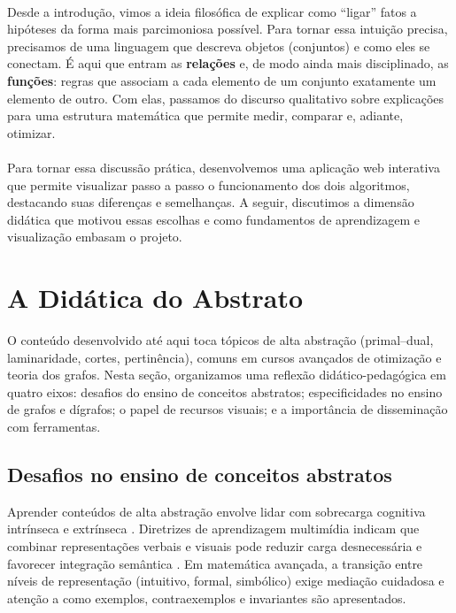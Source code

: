 \documentclass[12pt,a4paper]{article}
\begin{document}
\paragraph{}
Desde a introdução, vimos a ideia filosófica de explicar como “ligar” fatos a hipóteses da forma mais parcimoniosa possível. Para tornar essa intuição precisa, precisamos de uma linguagem que descreva objetos (conjuntos) e como eles se conectam. É aqui que entram as \textbf{relações} e, de modo ainda mais disciplinado, as \textbf{funções}: regras que associam a cada elemento de um conjunto exatamente um elemento de outro. Com elas, passamos do discurso qualitativo sobre explicações para uma estrutura matemática que permite medir, comparar e, adiante, otimizar.

\paragraph{}
Para tornar essa discussão prática, desenvolvemos uma aplicação web interativa que permite visualizar passo a passo o funcionamento dos dois algoritmos, destacando suas diferenças e semelhanças. A seguir, discutimos a dimensão didática que motivou essas escolhas e como fundamentos de aprendizagem e visualização embasam o projeto.

\section{A Didática do Abstrato}
\label{sec:didatica-abstrato}

O conteúdo desenvolvido até aqui toca tópicos de alta abstração (primal--dual, laminaridade, cortes, pertinência), comuns em cursos avançados de otimização e teoria dos grafos. Nesta seção, organizamos uma reflexão didático-pedagógica em quatro eixos: desafios do ensino de conceitos abstratos; especificidades no ensino de grafos e dígrafos; o papel de recursos visuais; e a importância de disseminação com ferramentas.

\subsection{Desafios no ensino de conceitos abstratos}
Aprender conteúdos de alta abstração envolve lidar com sobrecarga cognitiva intrínseca e extrínseca \cite{sweller1988cognitive}. Diretrizes de aprendizagem multimídia indicam que combinar representações verbais e visuais pode reduzir carga desnecessária e favorecer integração semântica \cite{mayer2009multimedia,paivio1990}. Em matemática avançada, a transição entre níveis de representação (intuitivo, formal, simbólico) exige mediação cuidadosa \cite{tall1991advanced} e atenção a como exemplos, contraexemplos e invariantes são apresentados.
\end{document}
